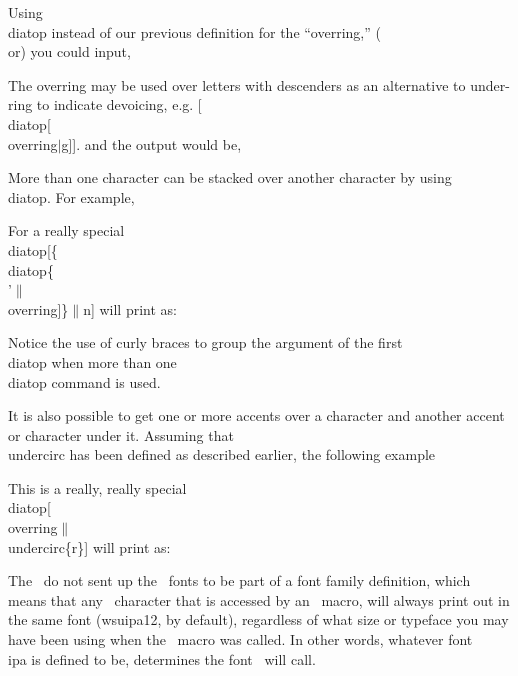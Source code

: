 Using \\diatop instead of our previous definition for the ``overring,'' (\\or)
you could input,
 
\aib
The overring may be used over letters with descenders as
an alternative to
under-ring to indicate devoicing, e.g. [\\diatop[\\overring$\vert$g]].
\aie
\nin and the output would be,
\vs{5pt}
\vs{5pt}
 
More than one character can be stacked over another character by using
\\diatop. For example,
 
\asisbegin
For a really special \\diatop[\{\\diatop\{\\'$\|$\\overring]\}$\|$n]
\asisend
\nin will print as:
\vs{5pt}
\vs{5pt}
 
\nin Notice the use of curly braces to group the argument of the first \\diatop
when more than one \\diatop command is used.
 
It is also possible to get one or more accents over a character and another
accent or character under it. Assuming that \\undercirc has been defined as
described earlier, the following example
 
\asisbegin\lin{-10pt}
This is a really, really special
\\diatop[\\overring$\|$\\undercirc\{r\}]
\asisend
\nin will print as:
\vs{5pt}
\vs{5pt}
 
The \ipam\ do not sent up the \wsu\ fonts to be part of a font family
definition, which means that any \wsu\ character that is accessed by
an \ipam\
macro, will always print out in the same font (wsuipa12, by default),
regardless of what size or typeface you may have been using when
the \ipam\
macro was called. In other words, whatever font \\ipa is defined to be,
determines the font \ipam\ will call.
 
